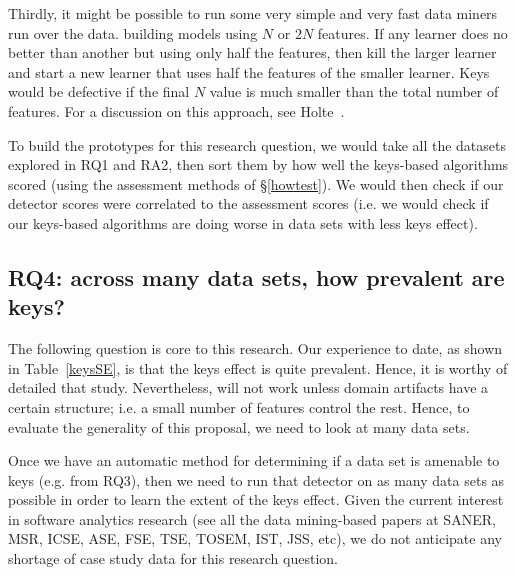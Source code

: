  Thirdly, it might be possible to
 run some very simple and very fast data miners run over the data. building models using $N$ or $2N$ features.
 If any learner does no better than another but using only half the features,
 then kill the larger learner and start a new learner that uses
 half the features of the smaller learner. Keys would be defective if the final $N$ value is much smaller than the total number of
 features.  For a discussion on this approach, see
 Holte~\cite{Holte93verysimple}.
 
 
   To build the prototypes   for this research question, we would take all the datasets
   explored in RQ1 and RA2, then sort them by how well the keys-based algorithms scored
   (using the assessment methods of \S\ref{howtest}). We would then check if our detector
   scores were correlated to the assessment scores (i.e. we would check if our keys-based
   algorithms are doing worse in data sets with less keys effect).  
  


\subsection{RQ4: across many data sets, how prevalent are keys?}

The following question is core to this research.
Our experience to date, as shown in Table~\ref{keysSE},
is that the keys effect is quite prevalent. Hence, it is worthy of
detailed that study. Nevertheless,
{\IT} will not work unless domain artifacts have a certain structure; i.e. 
a small number of features control the rest. 
Hence, to evaluate the generality of this proposal,
we need to look at many data sets.

Once we    have an automatic method for determining
 if a data set is amenable to keys (e.g. from RQ3), then we need to run that detector on as many data sets as possible in order to learn the extent
 of the keys effect. 
 Given the current interest in software analytics 
 research (see all the data mining-based papers at SANER, MSR, ICSE, ASE, FSE, TSE, TOSEM, IST, JSS, etc), we do not anticipate any shortage of
 case study data for this research question.
 

